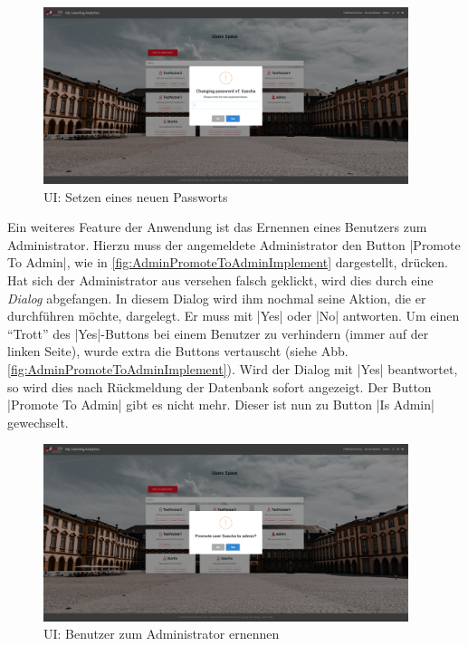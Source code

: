 \begin{figure}[!htb]
	\centering
	\includegraphics[width=0.95\textwidth, keepaspectratio]{img/client/AdmiSetPasswordOfUser.png}
	\captionsetup{justification=centering, format=plain}
	\caption[\acf{UI}: Setzen eines neuen Passworts]{\acf{UI}: Setzen eines neuen Passworts \\ \quelleScreenshot}
	\label{fig:AdminSetNewPasswordImplement}
\end{figure}

Ein weiteres Feature der Anwendung ist das Ernennen eines Benutzers zum Administrator.
Hierzu muss der angemeldete Administrator den Button \jinline|Promote To Admin|, wie in \abb \vref{fig:AdminPromoteToAdminImplement} dargestellt, drücken.
Hat sich der Administrator aus versehen falsch geklickt, wird dies durch eine \emph{Dialog} abgefangen.
In diesem Dialog wird ihm nochmal seine Aktion, die er durchführen möchte, dargelegt.
Er muss mit \jinline|Yes| oder \jinline|No| antworten.
Um einen \enquote{Trott} des \jinline|Yes|-Buttons bei einem Benutzer zu verhindern (immer auf der linken Seite), wurde extra die Buttons vertauscht (siehe Abb. \vref{fig:AdminPromoteToAdminImplement}).\newline
Wird der Dialog mit \jinline|Yes| beantwortet, so wird dies nach Rückmeldung der Datenbank sofort angezeigt.
Der Button \jinline|Promote To Admin| gibt es nicht mehr.
Dieser ist nun zu Button \jinline|Is Admin| gewechselt.

\begin{figure}[!htb]
	\centering
	\includegraphics[width=0.95\textwidth, keepaspectratio]{img/client/AdminPromoteToAdmin.png}
	\captionsetup{justification=centering, format=plain}
	\caption[\acf{UI}: Benutzer zum Administrator ernennen]{\acf{UI}: Benutzer zum Administrator ernennen \\ \quelleScreenshot}
	\label{fig:AdminPromoteToAdminImplement}
\end{figure}



